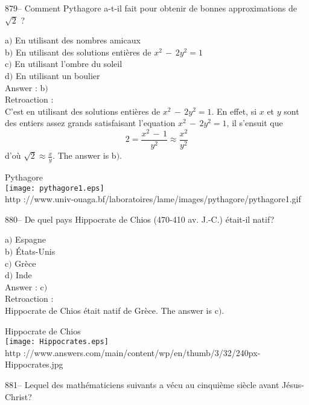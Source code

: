 ﻿\documentclass[letterpaper, 12pt]{article}
\begin{document}
879-- Comment Pythagore a-t-il fait pour obtenir de bonnes
approximations de $\sqrt2$ ?

a$)$ En utilisant des nombres amicaux \\
b$)$ En utilisant des solutions enti\`eres de $x^2\,-\,2y^2=1$ \\
c$)$ En utilisant l'ombre du soleil \\
d$)$ En utilisant un boulier\\

Answer : b$)$\\

Retroaction : \\
C'est en utilisant des solutions enti\`eres de $x^2\,-\,2y^2=1$. En
effet, si $x$ et $y$ sont des entiers assez grands satisfaisant
l'equation $x^2\,-\,2y^2=1$, il s'ensuit que
$$2=\displaystyle{\frac{x^2\,-\,1}{y^2}\approx\frac{x^2}{y^2}}$$
d'o\`u $\sqrt2\approx\frac xy$. The answer is b$)$.\\

        \begin{center}
        Pythagore\\
    \texttt{[image: pythagore1.eps]}\\
        {\footnotesize http
://www.univ-ouaga.bf/laboratoires/lame/images/pythagore/pythagore1.gif}
    \end{center}

880-- De quel pays Hippocrate de Chios (470-410 av. J.-C.)
\'etait-il natif?

a$)$ Espagne \\
b$)$ \'Etats-Unis \\
c$)$ Gr\`ece \\
d$)$ Inde\\

Answer : c$)$\\

Retroaction : \\
Hippocrate de Chios \'etait natif de Gr\`ece. The answer is c$)$.\\

        \begin{center}
        Hippocrate de Chios\\
    \texttt{[image: Hippocrates.eps]}\\
        {\footnotesize http
://www.answers.com/main/content/wp/en/thumb/3/32/240px-Hippocrates.jpg}
    \end{center}

881-- Lequel des math\'ematiciens suivants a v\'ecu au cinqui\`eme
si\`ecle avant J\'esus-Christ?
\end{document}
